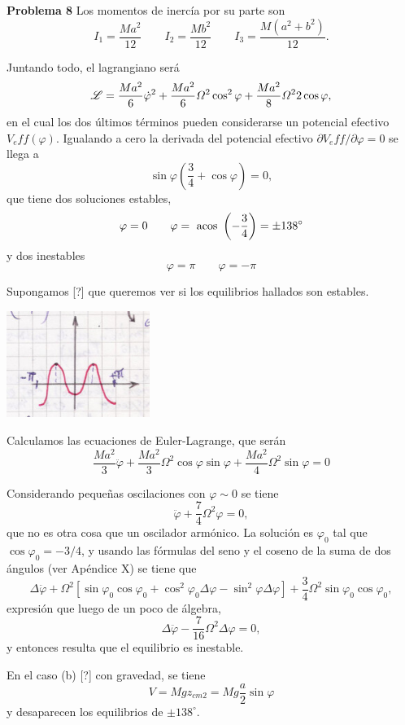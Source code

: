 \documentclass[10pt,oneside]{CBFT_book}
\begin{document}
\begin{ejemplo}{\bf Problema 8}
Los momentos de inercía por su parte son 
\[
	I_1 = \frac{Ma^2}{12} \qquad I_2 = \frac{Mb^2}{12} \qquad I_3 = \frac{M(a^2+b^2)}{12}.
\]

Juntando todo, el lagrangiano será
\[
	\mathscr{L} = \frac{Ma^2}{6}\dot{\varphi}^2 + \frac{Ma^2}{6}\Omega^2\cos^2\varphi + \frac{Ma^2}{8}\Omega^2 2 \cos\varphi,
\]
en el cual los dos últimos términos pueden considerarse un potencial efectivo $V_eff(\varphi)$.
Igualando a cero la derivada del potencial efectivo $\partial V_eff/\partial\varphi =0$ se llega a
\[
	\sin\varphi \left(\frac 3 4 + \cos\varphi \right) = 0,
\]
que tiene dos soluciones estables,
\[
	\varphi = 0 \qquad \varphi = \text{ acos }\left( -\frac 3 4 \right) = \pm 138^\circ
\]
y dos inestables
\[
	\varphi = \pi \qquad \varphi=-\pi
\]

Supongamos [?] que queremos ver si los equilibrios hallados son estables.

\includegraphics[width=0.35\textwidth]{images/fig_mc_prob8_4.jpg}

Calculamos las ecuaciones de Euler-Lagrange, que serán
\[
	\frac{Ma^2}{3}\ddot{\varphi} + \frac{Ma^2}{3} \Omega^2 \cos\varphi \sin\varphi
	+ \frac{Ma^2}{4} \Omega^2 \sin\varphi = 0
\]

Considerando pequeñas oscilaciones con $\varphi \sim 0$ se tiene 
\[
	\ddot{\varphi} + \frac{7}{4}\Omega^2\varphi = 0,
\]
que no es otra cosa que un oscilador armónico. La solución es $\varphi_0$ tal que $ \cos\varphi_0= -3/4 $, y usando
las fórmulas del seno y el coseno de la suma de dos ángulos (ver Apéndice X) se tiene que 
\[
	\Delta \ddot{\varphi} + \Omega^2 
	\left[ \sin\varphi_0 \cos\varphi_0 + \cos^2\varphi_0\Delta \varphi - \sin^2 \varphi \Delta\varphi \right]
	+ \frac{3}{4} \Omega^2 \sin\varphi_0 \cos\varphi_0,
\]
expresión que luego de un poco de álgebra,
\[
	\Delta \ddot{\varphi} -\frac 7 {16} \Omega^2 \Delta\varphi = 0,
\]
y entonces resulta que el equilibrio es inestable.

En el caso (b) [?] con gravedad, se tiene 
\[
	V = M g z_{cm2} = M g \frac{a}{2} \sin\varphi
\]
y desaparecen los equilibrios de $\pm 138^\circ$.
\end{ejemplo}
\end{document}
